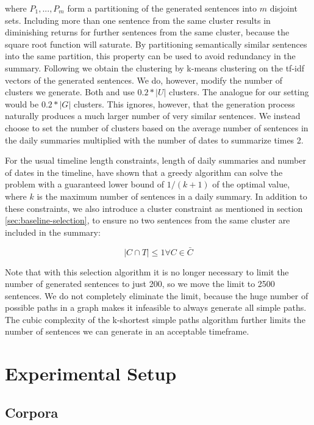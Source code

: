 \documentclass[a4paper,BCOR=10mm]{report}
\begin{document}
where $P_1, ..., P_m$ form a partitioning of the generated sentences into $m$ disjoint sets. Including more than one sentence from the same cluster results in diminishing returns for further sentences from the same cluster, because the square root function will saturate.
By partitioning semantically similar sentences into the same partition, this property can be used to avoid redundancy in the summary.
Following \citet{lin+blimes} we obtain the clustering by k-means clustering on the tf-idf vectors of the generated sentences. We do, however, modify the number of clusters we generate. Both \citet{lin+blimes} and \citet{markert} use $0.2 * |U|$ clusters. The analogue for our setting would be $0.2 * |G|$ clusters. This ignores, however, that the generation process naturally produces a much larger number of very similar sentences. We instead choose to set the number of clusters based on the average number of sentences in the daily summaries multiplied with the number of dates to summarize times 2.

 For the usual timeline length constraints, length of daily summaries and number of dates in the timeline, \citet{markert} have shown that a greedy algorithm can solve the problem with a guaranteed lower bound of $1 / (k + 1)$ of the optimal value, where $k$ is the maximum number of sentences in a daily summary.
 In addition to these constraints, we also introduce a cluster constraint as mentioned in section \ref{sec:baseline-selection}, to ensure no two sentences from the same cluster are included in the summary:

\begin{displaymath}
|C \cap T| \leq 1 \forall C \in \bar{C}
\end{displaymath}

Note that with this selection algorithm it is no longer necessary to limit the number of generated sentences to just 200, so we move the limit to 2500 sentences.
We do not completely eliminate the limit, because the huge number of possible paths in a graph makes it infeasible to always generate all simple paths. The cubic complexity of the k-shortest simple paths algorithm further limits the number of sentences we can generate in an acceptable timeframe.

\chapter{Experimental Setup}

\section{Corpora} \label{sec:corpora}
\end{document}
